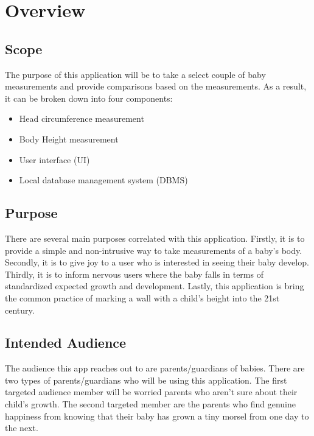 \documentclass[onecolumn, draftclsnofoot,10pt, compsoc]{IEEEtran}
\begin{document}
\section{Overview}
\subsection{Scope}
The purpose of this application will be to take a select couple of baby measurements and provide comparisons based on the measurements.
As a result, it can be broken down into four components:

\begin{itemize}
    \item Head circumference measurement
    \item Body Height measurement
    \item User interface (UI)
    \item Local database management system (DBMS)
\end{itemize}


\subsection{Purpose}

There are several main purposes correlated with this application. Firstly, it is to provide a simple and non-intrusive way to take measurements of a baby's body. Secondly, it is to give joy to a user who is interested in seeing their baby develop. Thirdly, it is to inform nervous users where the baby falls in terms of standardized expected growth and development. Lastly, this application is bring the common practice of marking a wall with a child's height into the 21st century.

\subsection{Intended Audience}

The audience this app reaches out to are parents/guardians of babies. There are two types of parents/guardians who will be using this application. The first targeted audience member will be worried parents who aren't sure about their child's growth. The second targeted member are the parents who find genuine happiness from knowing that their baby has grown a tiny morsel from one day to the next. \\
\end{document}
